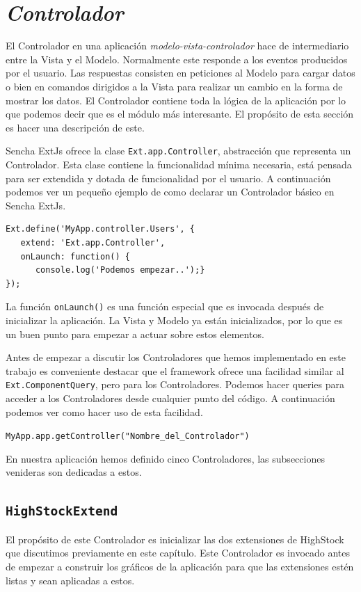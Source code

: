 \section{\emph{Controlador}}
	El Controlador en una aplicación \emph{modelo-vista-controlador}\cite{MVCWiki} hace de intermediario entre la Vista y el Modelo. Normalmente
	este responde a los eventos producidos por el usuario. Las respuestas consisten en peticiones al Modelo para cargar datos o bien en comandos
	dirigidos a la Vista para realizar un cambio en la forma de mostrar los datos. El Controlador contiene toda la lógica de la aplicación por lo
	que podemos decir que es el módulo más interesante. El propósito de esta sección es hacer una descripción de este.
	\par
	Sencha ExtJs ofrece la clase \texttt{Ext.app.Controller}, abstracción que representa un Controlador. Esta clase contiene la funcionalidad
	mínima necesaria, está pensada para ser extendida y dotada de funcionalidad por el usuario. A continuación podemos ver un pequeño ejemplo de
	como declarar un Controlador básico en Sencha ExtJs.
	\begin{lstlisting}[style=myJs]
Ext.define('MyApp.controller.Users', {
   extend: 'Ext.app.Controller',
   onLaunch: function() {
      console.log('Podemos empezar..');}
});
	\end{lstlisting}
	\par
	La función \texttt{onLaunch()} es una función especial que es invocada después de inicializar la aplicación. La Vista y Modelo ya están
	inicializados, por lo que es un buen punto para empezar a actuar sobre estos elementos.
	\par
	Antes de empezar a discutir los Controladores que hemos implementado en este trabajo es conveniente destacar que el framework ofrece una
	facilidad similar al \texttt{Ext.ComponentQuery}, pero para los Controladores. Podemos hacer queries para acceder a los Controladores desde
	cualquier punto del código. A continuación podemos ver como hacer uso de esta facilidad.
    		\begin{center} \texttt{MyApp.app.getController("Nombre\_del\_Controlador")}  \end{center}
	\par
	En nuestra aplicación hemos definido cinco Controladores, las subsecciones venideras son dedicadas a estos.
	\subsection{\texttt{HighStockExtend}}
		El propósito de este Controlador es inicializar las dos extensiones de HighStock que discutimos previamente en este capítulo. Este
		Controlador es invocado antes de empezar a construir los gráficos de la aplicación para que las extensiones estén listas y sean
		aplicadas a estos.
